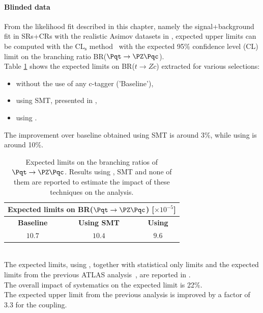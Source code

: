 \paragraph {Blinded data} From the likelihood fit described in this chapter, namely the
signal+background fit in SRs+CRs with the realistic Asimov datasets in ,
expected upper limits can be computed with the $\mathrm{CL_{s}}$ method~\cite{Junk:1999kv,Read:2002hq} with the expected 95\% confidence level (CL) limit on the branching ratio BR($\Pqt\rightarrow\PZ\Pqc$).\\
Table \ref{tab:limits:comparison} shows the expected limits on BR($t \rightarrow Zc$) extracted for various selections: 
\begin{itemize}
	\item without the use of any c-tagger ('Baseline'),
	\item using SMT, presented in ,
	\item using \DLrc.
\end{itemize}
The improvement over baseline obtained using SMT is around 3\%, while using \DLrc is around 10\%.
\begin{table}[htbp]
	\centering
	\begin{tabular}{c|c|c}
		\toprule
		\multicolumn{3}{c}{Expected limits on BR($\Pqt\rightarrow\PZ\Pqc$) [$ \times 10^{-5}$] }\\
		\toprule
		\textbf{Baseline}          & \textbf{Using SMT}			& \textbf{Using \DLrc} \\
		\midrule
		$10.7 $ 	& $ 10.4 $   & $  9.6 $\\
		\bottomrule
	\end{tabular}
	\caption{ Expected limits on the branching ratios of $\Pqt\rightarrow\PZ\Pqc$. 
		Results using \DLrc, SMT and none of them are reported to estimate the impact of these techniques on the analysis.  }%
	\label{tab:limits:comparison}
\end{table}
\\The expected limits, using \DLrc, together
with statistical only limits and the expected limits from the previous ATLAS
analysis~\cite{TOPQ-2017-06}, are reported in
.\\
The overall impact of systematics on the expected limit is 22\%.\\
The expected upper limit from the previous analysis is improved by a factor of 3.3 for the \tZc coupling.

